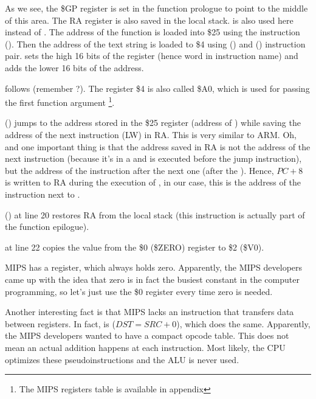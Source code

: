 As we see, the \$GP register is set in the function prologue to point to the middle of this area.
The \ac{RA} register is also saved in the local stack.
\puts is also used here instead of \printf.
The address of the \puts function is loaded into \$25 using  the instruction ().
Then the address of the text string is loaded to \$4 using  () and 
 () instruction pair.
 sets the high 16 bits of the register (hence  word in instruction name) and  adds
the lower 16 bits of the address.

 follows  (remember ?).
The register \$4 is also called \$A0, which is used for passing the first function argument
\footnote{The MIPS registers table is available in appendix }.


 () jumps to the address stored in the \$25 register (address of \puts) 
while saving the address of the next instruction (LW) in \ac{RA}.
This is very similar to ARM.
Oh, and one important thing is that the address saved in \ac{RA} is not the address of the next instruction (because
it's in a  and is executed before the jump instruction),
but the address of the instruction after the next one (after the ).
Hence, $PC + 8$ is written to \ac{RA} during the execution of , in our case, this is the address of the 
instruction next to .

 () at line 20 restores \ac{RA} from the local stack (this instruction is actually part of the function epilogue).


 at line 22 copies the value from the \$0 (\$ZERO) register to \$2 (\$V0).
\label{MIPS_zero_register}

MIPS has a  register, which always holds zero.
Apparently, the MIPS developers came up with the idea that zero is in fact the busiest constant in the computer programming,
so let's just use the \$0 register every time zero is needed.

Another interesting fact is that MIPS lacks an instruction that transfers data between registers.
In fact,  is  ($DST=SRC+0$), which does the same.
Apparently, the MIPS developers wanted to have a compact opcode table.
This does not mean an actual addition happens at each  instruction.
Most likely, the \ac{CPU} optimizes these pseudoinstructions and the \ac{ALU} is never used.

